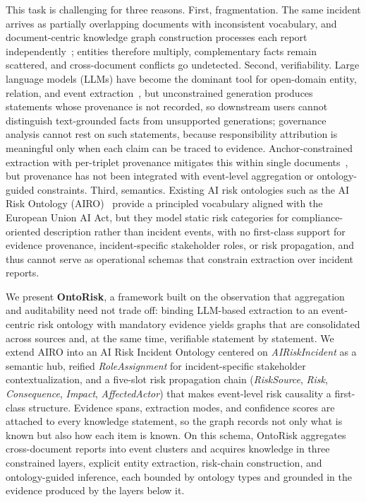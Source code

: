 \documentclass[a4paper,fleqn]{cas-dc}
\begin{document}
This task is challenging for three reasons.
First, fragmentation. The same incident arrives as partially
overlapping documents with inconsistent vocabulary, and
document-centric knowledge graph construction processes each report
independently~\cite{9416312,10.1145/3447772,gao-etal-2024-harvesting};
entities therefore multiply, complementary facts remain scattered,
and cross-document conflicts go undetected.
Second, verifiability. Large language models (LLMs) have become the
dominant tool for open-domain entity, relation, and event
extraction~\cite{10.5555/3495724.3495883,li2025eventextractionlargelanguage},
but unconstrained generation produces statements whose provenance is
not recorded, so downstream users cannot distinguish text-grounded
facts from unsupported generations; governance analysis cannot rest
on such statements, because responsibility attribution is meaningful
only when each claim can be traced to evidence. Anchor-constrained
extraction with per-triplet provenance mitigates this within single
documents~\cite{computers15030178}, but provenance has not been
integrated with event-level aggregation or ontology-guided
constraints.
Third, semantics. Existing AI risk ontologies such as the AI Risk
Ontology (AIRO)~\cite{airo2022} provide a principled vocabulary aligned
with the European Union AI Act, but they model static risk categories
for compliance-oriented description rather than incident events, with
no first-class support for evidence provenance, incident-specific
stakeholder roles, or risk propagation, and thus cannot serve as
operational schemas that constrain extraction over incident reports.

We present \textbf{OntoRisk}, a framework built on the observation
that aggregation and auditability need not trade off: binding
LLM-based extraction to an event-centric risk ontology with mandatory
evidence yields graphs that are consolidated across sources and, at
the same time, verifiable statement by statement.
We extend AIRO into an AI Risk Incident Ontology centered
on \textit{AIRiskIncident} as a semantic hub, reified
\textit{RoleAssignment} for incident-specific stakeholder
contextualization, and a five-slot risk propagation chain
(\textit{RiskSource}, \textit{Risk}, \textit{Consequence},
\textit{Impact}, \textit{AffectedActor}) that makes event-level risk
causality a first-class structure. Evidence spans, extraction modes,
and confidence scores are attached to every knowledge statement, so
the graph records not only what is known but also how each item is
known. On this schema, OntoRisk aggregates cross-document reports
into event clusters and acquires knowledge in three constrained
layers, explicit entity extraction, risk-chain construction, and
ontology-guided inference, each bounded by ontology types and
grounded in the evidence produced by the layers below it.
\end{document}
